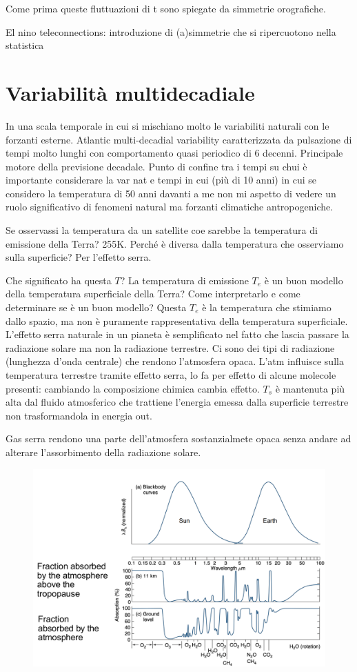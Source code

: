 Come prima queste fluttuazioni di t sono spiegate da simmetrie orografiche. 

El nino teleconnections: introduzione di (a)simmetrie che si ripercuotono nella statistica 


\section{Variabilità multidecadiale}
In una scala temporale in cui si mischiano molto le variabiliti naturali con le forzanti esterne. Atlantic multi-decadial variability caratterizzata da pulsazione di tempi molto lunghi con comportamento quasi periodico di 6 decenni. Principale motore della previsione decadale. Punto di confine tra i tempi su chui è importante considerare la var nat e tempi in cui (più di 10 anni) in cui se considero la temperatura di 50 anni davanti a me non mi aspetto di vedere un ruolo significativo di fenomeni natural ma forzanti climatiche antropogeniche. 

Se osservassi la temperatura da un satellite coe sarebbe la temperatura di emissione della Terra? 255K. Perché è diversa dalla temperatura che osserviamo sulla superficie? Per l’effetto serra.







Che significato ha questa $T$? La temperatura di emissione $T_e$ è un buon modello della temperatura superficiale della Terra? Come interpretarlo e come determinare se è un buon modello? Questa $T_e$ è la temperatura che stimiamo dallo spazio, ma non è puramente rappresentativa della temperatura superficiale.
L'effetto serra naturale in un pianeta è semplificato nel fatto che lascia passare la radiazione solare ma non la radiazione terrestre.
Ci sono dei tipi di radiazione (lunghezza d'onda centrale) che rendono l'atmosfera opaca. 
L'atm influisce sulla temperatura terrestre tramite effetto serra, lo fa per effetto di alcune molecole presenti: cambiando la composizione chimica cambia effetto. 
$T_s$ è mantenuta più alta dal fluido atmosferico che trattiene l'energia emessa dalla superficie terrestre non trasformandola in energia out.



Gas serra rendono una parte dell'atmosfera sostanzialmete opaca senza andare ad alterare l'assorbimento della radiazione solare.
\begin{figure}[htpb]
    \centering
    \includegraphics[width=0.5\linewidth]{uploads/ass terr.png}
    \label{fig:fin atm}
\end{figure}
